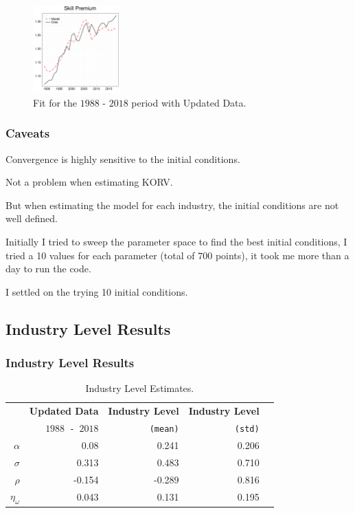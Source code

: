 \documentclass[notes,11pt, aspectratio=169]{beamer}
\newenvironment{wideitemize}{\itemize\addtolength{\itemsep}{10pt}}{\enditemize}
\begin{document}
\begin{frame}
{\begin{figure}[H]
 \hfill
 \includegraphics[width=0.3\textwidth]{../images/fig:updated_ind_estimation_sp_slides.pdf}
 \caption{\label{fig:korv_estimation_extended_industry} Fit for the $1988$ - $2018$ period with Updated Data.}
 \end{figure}
 }
\end{frame}

\begin{frame}
  \frametitle{Caveats}
  \begin{wideitemize}
    \item Convergence is highly sensitive to the initial conditions.
    \begin{wideitemize}
      \item Not a problem when estimating KORV.
      \item But when estimating the model for each industry, the initial conditions are not well defined.
    \end{wideitemize}
    \item Initially I tried to sweep the parameter space to find the best initial conditions, I tried a 10 values for each parameter (total of $700$ points), it took me more than a day to run the code.
    \item I settled on the trying 10 initial conditions.
  \end{wideitemize}
\end{frame}



\subsection{Industry Level Results}
\begin{frame}
 \frametitle{Industry Level Results}
 \begin{table}[h]
 \begin{center}
 \begin{tabular}{rrrrr}
  \hline\hline
    & \textbf{Updated Data} & \textbf{Industry Level}  & \textbf{Industry Level}  \\
    & \texttt{$1988$ - $2018$} & \texttt{(mean)} & \texttt{(std)} \\\hline
  $\alpha$ & 0.08 &  0.241 &  0.206 \\
  $\sigma$ & 0.313 &  0.483 &  0.710\\
  $\rho$ & -0.154 & -0.289 &  0.816\\
  $\eta_\omega$& 0.043 &  0.131 &  0.195\\\hline\hline
\end{tabular}
\end{center}
\caption{\label{tab:estimation_ind} Industry Level Estimates.}
\end{table}

\end{frame}
\end{document}
